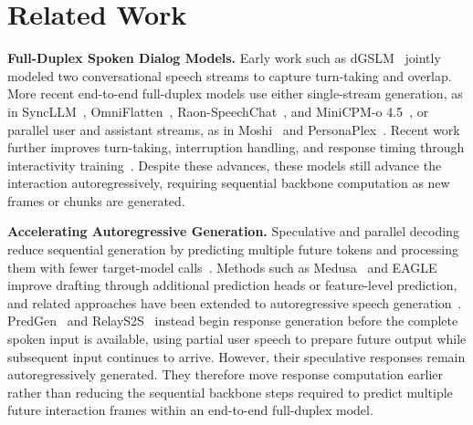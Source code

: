 \section{Related Work}
\label{sec:related_work}

\textbf{Full-Duplex Spoken Dialog Models.}
Early work such as dGSLM~\citep{nguyen-etal-2023-generative} jointly modeled two conversational speech streams to capture turn-taking and overlap.
More recent end-to-end full-duplex models use either single-stream generation, as in SyncLLM~\citep{veluri-etal-2024-beyond}, OmniFlatten~\citep{zhang-etal-2025-omniflatten}, Raon-SpeechChat~\citep{kim2026raonspeechtechnicalreport}, and MiniCPM-o 4.5~\citep{cui2026minicpmo45realtimefullduplex}, or parallel user and assistant streams, as in Moshi~\citep{defossez2024moshispeechtextfoundationmodel} and PersonaPlex~\citep{11463413}.
Recent work further improves turn-taking, interruption handling, and response timing through interactivity training~\citep{pmlr-v267-wu25t,hsiao2026aspirinactionspaceprojection,ohashi2026multifacetedinteractivityalignmentfullduplex,li2026decouplingconversationaldynamicsfullduplex}.
Despite these advances, these models still advance the interaction autoregressively, requiring sequential backbone computation as new frames or chunks are generated.

\textbf{Accelerating Autoregressive Generation.}
Speculative and parallel decoding reduce sequential generation by predicting multiple future tokens and processing them with fewer target-model calls~\citep{NEURIPS2018_c4127b91,pmlr-v202-leviathan23a,chen2023acceleratinglargelanguagemodel}.
Methods such as Medusa~\citep{pmlr-v235-cai24b} and EAGLE~\citep{pmlr-v235-li24bt} improve drafting through additional prediction heads or feature-level prediction, and related approaches have been extended to autoregressive speech generation~\citep{10887855,10888194,11464026}.
PredGen~\citep{li2025predgen} and RelayS2S~\citep{mai2026relays2sdualpathspeculativegeneration} instead begin response generation before the complete spoken input is available, using partial user speech to prepare future output while subsequent input continues to arrive.
However, their speculative responses remain autoregressively generated.
They therefore move response computation earlier rather than reducing the sequential backbone steps required to predict multiple future interaction frames within an end-to-end full-duplex model.

